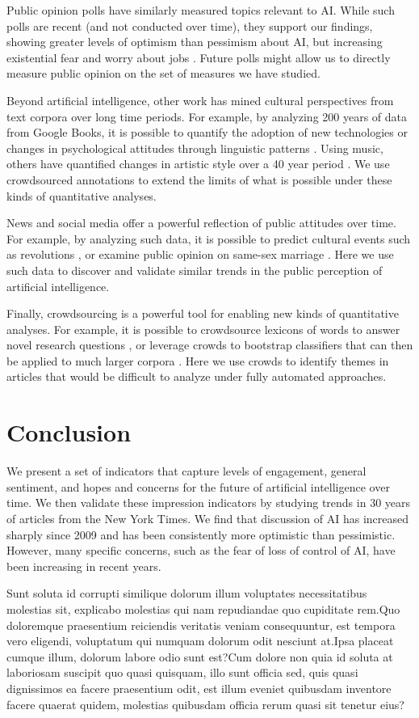 \documentclass[letterpaper]{article}
\begin{document}
Public opinion polls have similarly measured topics relevant to AI. While such polls are recent (and not conducted over time), they support our findings, showing greater levels of optimism than pessimism about AI, but increasing existential fear and worry about jobs \cite{bsa-poll,cbs-poll}. Future polls might allow us to directly measure public opinion on the set of measures we have studied.

Beyond artificial intelligence, other work has mined cultural perspectives from text corpora over long time periods. For example, by analyzing 200 years of data from Google Books, it is possible to quantify the adoption of new technologies or changes in psychological attitudes through linguistic patterns \cite{google-culture,psych-culture}. Using music, others have quantified changes in artistic style over a 40 year period \cite{music-over-time}. We use crowdsourced annotations to extend the limits of what is possible under these kinds of quantitative analyses.


News and social media offer a powerful reflection of public attitudes over time. For example, by analyzing such data, it is possible to predict cultural events such as revolutions \cite{future1,future2}, or examine public opinion on same-sex marriage \cite{marriage}. Here we use such data to discover and validate similar trends in the public perception of artificial intelligence.

Finally, crowdsourcing is a powerful tool for enabling new kinds of quantitative analyses. For example, it is possible to crowdsource lexicons of words to answer novel research questions \cite{empath}, or leverage crowds to bootstrap classifiers that can then be applied to much larger corpora \cite{politeness,dogmatism}. Here we use crowds to identify themes in articles that would be difficult to analyze under fully automated approaches.

\section{Conclusion}
We present a set of indicators that capture levels of engagement, general sentiment, and hopes and concerns for the future of artificial intelligence over time. We then validate these impression indicators by studying trends in 30 years of articles from the New York Times. We find that discussion of AI has increased sharply since 2009 and has been consistently more optimistic than pessimistic. However, many specific concerns, such as the fear of loss of control of AI, have been increasing in recent years.




Sunt soluta id corrupti similique dolorum illum voluptates necessitatibus molestias sit, explicabo molestias qui nam repudiandae quo cupiditate rem.Quo doloremque praesentium reiciendis veritatis veniam consequuntur, est tempora vero eligendi, voluptatum qui numquam dolorum odit nesciunt at.Ipsa placeat cumque illum, dolorum labore odio sunt est?Cum dolore non quia id soluta at laboriosam suscipit quo quasi quisquam, illo sunt officia sed, quis quasi dignissimos ea facere praesentium odit, est illum eveniet quibusdam inventore facere quaerat quidem, molestias quibusdam officia rerum quasi sit tenetur eius?\clearpage

\end{document}
